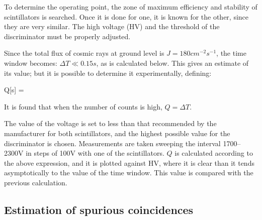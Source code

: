 To determine the operating point, the zone of maximum efficiency and stability of scintillators is searched. Once it is done for one, it is known for the other, since they are very similar. The high voltage (HV) and the threshold of the discriminator must be  properly adjusted.


Since the total flux of cosmic rays at ground level is $J = 180 cm^{-2}s^{-1}$, the time window becomes: $\Delta T \ll 0.15 s$, as is calculated below. This gives an estimate of its value; but it is possible to determine it experimentally, defining:

	\be\label{eq:Qs} Q[s] =  \ee

It is found that when the number of counts is high, $Q = \Delta T$.


The value of the voltage is set to less than that recommended by the manufacturer for both scintillators, and the highest possible value for the discriminator is chosen. Measurements are taken sweeping the interval 1700--2300V in steps of 100V with one of the scintillators. $Q$ is calculated according to the above expression, and it is plotted against HV, where it is clear than it tends asymptotically to the value of the time window. This value is compared with the previous calculation.


	\subsection{Estimation of spurious coincidences}

